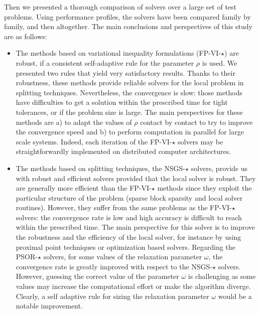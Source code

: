 Then we presented a thorough comparison of solvers over a large set of test problems. Using performance profiles, the solvers have been compared family by family, and then altogether. The main conclusions and perspectives of this study are as follows:
\begin{itemize}
\item The methods based on variational inequality formulations ({\sf FP-VI-$\star$}) are robust, if a consistent self-adaptive rule for the parameter $\rho$ is used. We presented two rules that yield very satisfactory results. Thanks to their robustness, these methods provide reliable solvers for the local problem in splitting techniques. Nevertheless, the convergence is slow: those methods have difficulties to get a solution within the prescribed time for tight tolerances, or if the problem size is large. The main perspectives for these methods are a) to adapt the values of $\rho$ contact by contact to try to improve the convergence speed and b) to perform computation in parallel for large scale systems. Indeed, each iteration of the {\sf FP-VI-$\star$} solvers may be straightforwardly implemented on distributed computer architectures.

\item The methods based on splitting techniques, the {\sf NSGS-$\star$} solvers, provide us with robust and efficient solvers provided that the local solver is robust. They are generally more efficient than the {\sf FP-VI-$\star$} methods since they exploit the particular structure of the problem (sparse block sparsity and local solver routines). However, they suffer from the same problems as the  {\sf FP-VI-$\star$} solvers: the convergence rate is low and high accuracy is difficult to reach within the prescribed time. The main perspective for this solver is to improve the robustness and the efficiency of the local solver, for instance by using proximal point techniques or optimization based solvers. Regarding the {\sf PSOR-$\star$} solvers, for some values of the relaxation parameter $\omega$, the convergence rate is greatly improved with respect to the {\sf NSGS-$\star$} solvers. However, guessing the correct value of the parameter $\omega$ is challenging as some values may increase the computational effort or make the algorithm diverge. Clearly, a self adaptive rule for sizing the relaxation parameter $\omega$ would be a notable improvement.


\end{itemize}
